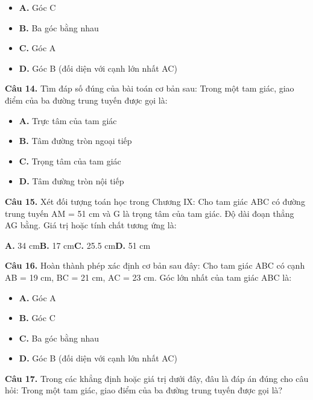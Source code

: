 \documentclass[11pt,a4paper]{article}
\begin{document}
\begin{itemize}\setlength{\itemsep}{1pt}\setlength{\parskip}{0pt}
  \item[] \textbf{A.} Góc C
  \item[] \textbf{B.} Ba góc bằng nhau
  \item[] \textbf{C.} Góc A
  \item[] \textbf{D.} Góc B (đối diện với cạnh lớn nhất AC)
\end{itemize}\vspace{2pt}
\textbf{\color{primary} Câu 14.} Tìm đáp số đúng của bài toán cơ bản sau: Trong một tam giác, giao điểm của ba đường trung tuyến được gọi là:\par
\begin{itemize}\setlength{\itemsep}{1pt}\setlength{\parskip}{0pt}
  \item[] \textbf{A.} Trực tâm của tam giác
  \item[] \textbf{B.} Tâm đường tròn ngoại tiếp
  \item[] \textbf{C.} Trọng tâm của tam giác
  \item[] \textbf{D.} Tâm đường tròn nội tiếp
\end{itemize}\vspace{2pt}
\textbf{\color{primary} Câu 15.} Xét đối tượng toán học trong Chương IX: Cho tam giác ABC có đường trung tuyến AM = 51 cm và G là trọng tâm của tam giác. Độ dài đoạn thẳng AG bằng. Giá trị hoặc tính chất tương ứng là:\par
\hspace*{1.5em}\textbf{A.} 34 cm\quad\quad \textbf{B.} 17 cm\quad\quad \textbf{C.} 25.5 cm\quad\quad \textbf{D.} 51 cm\par\vspace{2pt}
\textbf{\color{primary} Câu 16.} Hoàn thành phép xác định cơ bản sau đây: Cho tam giác ABC có cạnh AB = 19 cm, BC = 21 cm, AC = 23 cm. Góc lớn nhất của tam giác ABC là:\par
\begin{itemize}\setlength{\itemsep}{1pt}\setlength{\parskip}{0pt}
  \item[] \textbf{A.} Góc A
  \item[] \textbf{B.} Góc C
  \item[] \textbf{C.} Ba góc bằng nhau
  \item[] \textbf{D.} Góc B (đối diện với cạnh lớn nhất AC)
\end{itemize}\vspace{2pt}
\textbf{\color{primary} Câu 17.} Trong các khẳng định hoặc giá trị dưới đây, đâu là đáp án đúng cho câu hỏi: Trong một tam giác, giao điểm của ba đường trung tuyến được gọi là?\par
\end{document}
